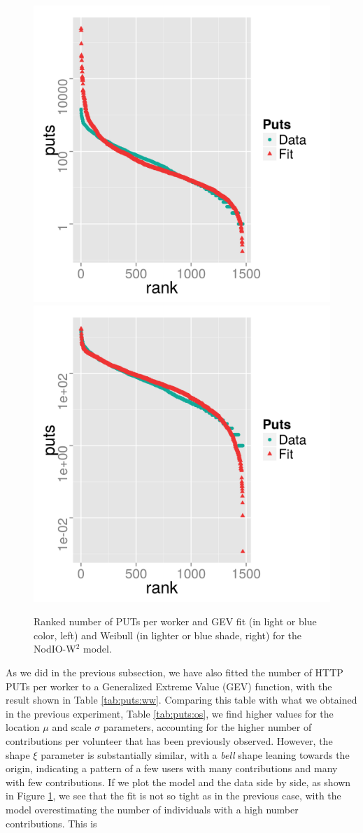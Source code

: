 \documentclass{sig-alternate}
\begin{document}
\begin{figure}[!htb]
\centering
\includegraphics[width=0.49\linewidth]{gev-fit-ww.png}
\includegraphics[width=0.49\linewidth]{weibull-fit-ww.png}
\caption{Ranked number of PUTs per worker and GEV fit (in light
  or blue color, left) 
and Weibull (in lighter or blue shade, right) for the {\sf NodIO-W$^2$} model.}  
\label{fig:gev:w2}
\end{figure}
%
As we did in the previous subsection, we have also fitted the number
of HTTP PUTs per worker to a  Generalized Extreme Value (GEV) function, with the result shown
in Table \ref{tab:puts:ww}. Comparing this table with what we obtained
in the previous experiment, Table \ref{tab:puts:os}, we find higher values
for the location $\mu$ and scale $\sigma$ parameters, accounting for
the higher number of contributions per volunteer that has been
previously observed. However, the shape $\xi$ parameter is
substantially similar, with a {\em bell} shape leaning towards the
origin, indicating a pattern of a few users with many contributions
and many with few contributions. If we plot the model and the data
side by side, as shown in Figure \ref{fig:gev:w2}, we see that the fit
is not so tight as in the previous case, with the model overestimating
the number of individuals with a high number contributions. This is
\end{document}
